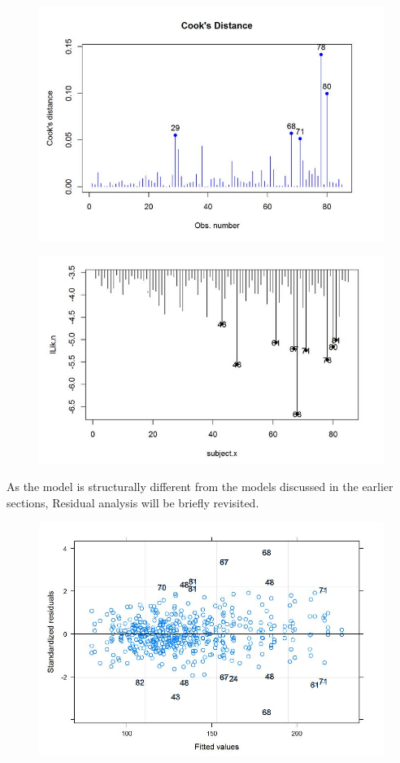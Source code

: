 \documentclass[12pt, a4paper]{report}
\theoremstyle{plain}
\theoremstyle{definition}
\theoremstyle{remark}
\begin{document}
\begin{figure}[h!]
	\centering
	\includegraphics[width=0.7\linewidth]{images/CooksDistancePlot-JS-Roy}
	\caption{}
	\label{fig:CooksDistancePlot-JS-Roy}
\end{figure}

\begin{figure}[h!]
	\centering
	\includegraphics[width=0.7\linewidth]{images/LogLik-JS-Roy}
	\caption{}
	\label{fig:LogLik-JS-Roy}
\end{figure}

As the model is structurally different from the models discussed in the earlier sections, Residual analysis will be briefly revisited.
\begin{figure}[h!]
	\centering
	\includegraphics[width=0.7\linewidth]{images/Residuals-JS-Roy}
	\caption{}
	\label{fig:Residuals-JS-Roy}
\end{figure}
\end{document}
